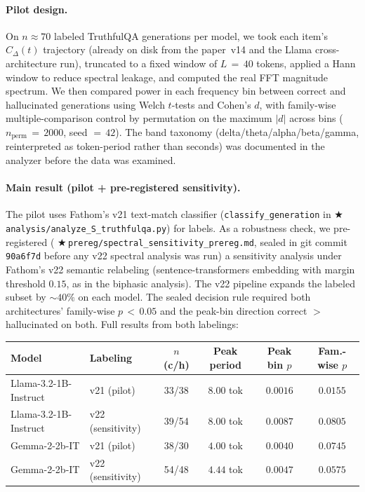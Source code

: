 \documentclass[11pt,letterpaper]{article}
\newcommand{\repro}[1]{%
  \textcolor{fathomgreen}{\footnotesize$\bigstar$\,\texttt{#1}}}
\begin{document}
\paragraph{Pilot design.} On $n\!\approx\!70$ labeled TruthfulQA
generations per model, we took each item's $C_\Delta(t)$ trajectory
(already on disk from the paper~v14 and the Llama cross-architecture
run), truncated to a fixed window of $L\,=\,40$ tokens, applied a
Hann window to reduce spectral leakage, and computed the real FFT
magnitude spectrum. We then compared power in each frequency bin
between correct and hallucinated generations using Welch $t$-tests and
Cohen's $d$, with family-wise multiple-comparison control by permutation
on the maximum $|d|$ across bins ($n_{\text{perm}}\,=\,2000$,
seed $=\,42$). The band taxonomy (delta/theta/alpha/beta/gamma,
reinterpreted as token-period rather than seconds) was documented in
the analyzer before the data was examined.

\paragraph{Main result (pilot + pre-registered sensitivity).}
The pilot uses Fathom's v21 text-match classifier
(\texttt{classify\_generation} in
\repro{analysis/analyze\_S\_truthfulqa.py}) for labels. As a robustness
check, we pre-registered
(\repro{prereg/spectral\_sensitivity\_prereg.md}, sealed in git commit
\texttt{90a6f7d} before any v22 spectral analysis was run) a sensitivity
analysis under Fathom's v22 semantic relabeling (sentence-transformers
embedding with margin threshold $0.15$, as in the biphasic analysis).
The v22 pipeline expands the labeled subset by $\sim\!40\%$ on each
model. The sealed decision rule required both architectures' family-wise
$p\,<\,0.05$ and the peak-bin direction correct $>$ hallucinated on
both. Full results from both labelings:

\begin{center}
\begin{tabular}{llcccc}
\toprule
\textbf{Model} & \textbf{Labeling} & \textbf{$n$ (c/h)} &
\textbf{Peak period} & \textbf{Peak bin $p$} & \textbf{Fam.-wise $p$} \\
\midrule
Llama-3.2-1B-Instruct & v21 (pilot)       & 33/38 & $8.00$ tok & $0.0016$ & $\mathbf{0.0155}$ \\
Llama-3.2-1B-Instruct & v22 (sensitivity) & 39/54 & $8.00$ tok & $0.0087$ & $0.0805$ \\
Gemma-2-2b-IT         & v21 (pilot)       & 38/30 & $4.00$ tok & $0.0040$ & $0.0745$ \\
Gemma-2-2b-IT         & v22 (sensitivity) & 54/48 & $4.44$ tok & $0.0047$ & $0.0575$ \\
\bottomrule
\end{tabular}
\end{center}
\end{document}
